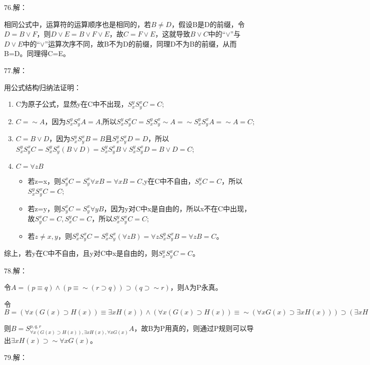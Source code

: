 \documentclass[a4paper]{ctexart}
\begin{document}
\noindent 76.解：

相同公式中，运算符的运算顺序也是相同的，若$B\neq D$，假设B是D的前缀，令$D=B\vee F$，则$D\vee E=B\vee F\vee E$，故$C=F\vee E$，这就导致$B\vee C$中的“$\vee$”与$D\vee E$中的“$\vee$”运算次序不同，故B不为D的前缀，同理D不为B的前缀，从而B=D。同理得C=E。\newline
  
\noindent 77.解：

用公式结构归纳法证明：
\begin{enumerate}
  \item C为原子公式，显然y在C中不出现，$S_x^yS_y^xC=C$;
  \item $C=\sim A$，因为$S_x^yS_y^xA=A$,所以$S_x^yS_y^xC=S_x^yS_y^x\sim A=\sim S_x^yS_y^xA=\sim A=C$;
  \item $C=B\vee D$，因为$S_x^yS_y^xB=B$且$S_x^yS_y^xD=D$，所以$S_x^yS_y^xC=S_x^yS_y^x(B\vee D)=S_x^yS_y^xB\vee S_x^yS_y^xD=B\vee D=C$;
  \item $C=\forall{z}B$
  \begin{itemize}
    \item 若z=x，则$S^x_yC=S^x_y\forall{x}B=\forall{x}B=C$,y在C中不自由，$S^y_xC=C$，所以$S_x^yS_y^xC=C$;
    \item 若z=y，则$S^x_yC=S^x_y\forall{y}B$，因为y对C中x是自由的，所以x不在C中出现，故$S^x_yC=C,S^y_xC=C$，所以$S_x^yS_y^xC=C$;
    \item 若$z\neq x,y$，则$S_x^yS_y^xC=S_x^yS_y^x(\forall{z}B)=\forall{z}S_x^yS_y^xB=\forall{z}B=C$。
  \end{itemize}
\end{enumerate}
综上，若y在C中不自由，且y对C中x是自由的，则$S_x^yS_y^xC=C$。

\noindent 78.解：

令$A=(p\equiv q)\wedge(p\equiv\sim(r\supset q))\supset (q\supset\sim r)$，则A为P永真。

令$B=(\forall{x}(G(x)\supset H(x))\equiv \exists{x}H(x))\wedge (\forall{x}(G(x)\supset H(x))\equiv \sim(\forall{x}G(x)\supset \exists{x}H(x)))\supset(\exists{x}H(x)\supset\sim\forall{x}G(x))$

则$B=S^{p,q,r}_{\forall{x}(G(x)\supset H(x)),\exists{x}H(x),\forall{x}G(x)}A$，故B为P用真的，则通过P规则可以导出$\exists{x}H(x)\supset\sim\forall{x}G(x)$。\newline

\noindent 79.解：
\end{document}
